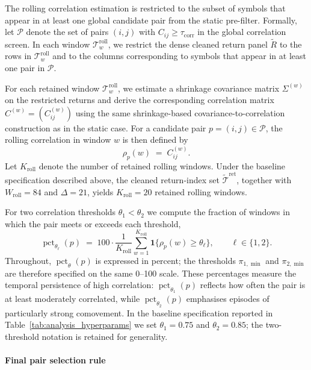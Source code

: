 \documentclass[11pt,a4paper]{article}
\begin{document}
The rolling correlation estimation is restricted to the subset of symbols that
appear in at least one global candidate pair from the static pre-filter.
Formally, let \(\mathcal{P}\) denote the set of pairs \((i,j)\) with
\(C_{ij} \ge \tau_{\text{corr}}\) in the global correlation screen. In each
window \(\mathcal{T}^{\mathrm{roll}}_w\), we restrict the dense cleaned return panel
\(\widetilde R\) to the rows in \(\mathcal{T}^{\mathrm{roll}}_w\) and to the columns
corresponding to symbols that appear in at least one pair in \(\mathcal{P}\).

For each retained window \(\mathcal{T}^{\mathrm{roll}}_w\), we estimate a shrinkage covariance
matrix \(\Sigma^{(w)}\) on the restricted returns and derive the corresponding
correlation matrix \(C^{(w)} = (C^{(w)}_{ij})\) using the same
shrinkage-based covariance-to-correlation construction as in the static case.
For a candidate pair \(p=(i,j)\in\mathcal{P}\), the rolling correlation in
window \(w\) is then defined by
\[
  \rho_p(w) \;=\; C^{(w)}_{ij}.
\]
Let \(K_{\mathrm{roll}}\) denote the number of retained rolling windows. Under the baseline
specification described above, the cleaned return-index set
\(\widetilde{\mathcal{T}}^{\mathrm{ret}}\), together with
\(W_{\text{roll}}=84\) and \(\Delta=21\), yields \(K_{\mathrm{roll}}=20\) retained rolling
windows.

For two correlation thresholds \(\theta_1 < \theta_2\) we compute the fraction
of windows in which the pair meets or exceeds each threshold,
\[
  \operatorname{pct}_{\theta_\ell}(p)
  \;=\;
  100 \cdot \frac{1}{K_{\mathrm{roll}}}
  \sum_{w=1}^{K_{\mathrm{roll}}} \mathbf{1}\{\rho_p(w) \ge \theta_\ell\},
  \qquad \ell \in \{1,2\}.
\]
Throughout, \(\operatorname{pct}_{\theta}(p)\) is expressed in percent; the
thresholds \(\pi_{1,\min}\) and \(\pi_{2,\min}\) are therefore specified on the
same 0--100 scale. These percentages measure the temporal persistence of high
correlation: \(\operatorname{pct}_{\theta_1}(p)\) reflects how often the pair is
at least moderately correlated, while \(\operatorname{pct}_{\theta_2}(p)\)
emphasises episodes of particularly strong comovement. In the baseline
specification reported in Table~\ref{tab:analysis_hyperparams} we set
\(\theta_1 = 0.75\) and \(\theta_2 = 0.85\); the two-threshold notation is
retained for generality.

\paragraph{Final pair selection rule}
\end{document}
